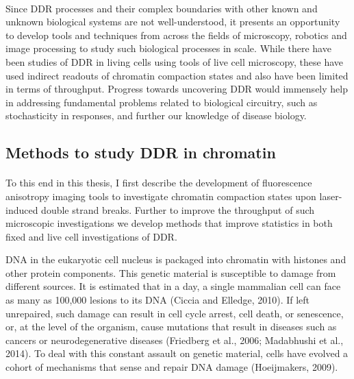 \paragraph*{} Since DDR processes and their complex boundaries with other known and unknown biological systems are not well-understood, it presents an opportunity to develop tools and techniques from across the fields of microscopy, robotics and image processing to study such biological processes in scale. While there have been studies of DDR in living cells using tools of live cell microscopy, these have used indirect readouts of chromatin compaction states and also have been limited in terms of throughput. Progress towards uncovering DDR would immensely help in addressing fundamental problems related to biological circuitry, such as stochasticity in responses, and further our knowledge of disease biology.

\subsection{Methods to study DDR in chromatin}
\paragraph*{} To this end in this thesis, I first describe the development of fluorescence anisotropy imaging tools to investigate chromatin compaction states upon laser-induced double strand breaks. Further to improve the throughput of such microscopic investigations we develop methods that improve statistics in both fixed and live cell investigations of DDR.



DNA in the eukaryotic cell nucleus is packaged into chromatin with histones and other protein components. This genetic material is susceptible to damage from different sources. It is estimated that in a day, a single mammalian cell can face as many as 100,000 lesions to its DNA (Ciccia and Elledge, 2010). If left unrepaired, such damage can result in cell cycle arrest, cell death, or senescence, or, at the level of the organism, cause mutations that result in diseases such as cancers or neurodegenerative diseases (Friedberg et al., 2006; Madabhushi et al., 2014). To deal with this constant assault on genetic material, cells have evolved a cohort of mechanisms that sense and repair DNA damage (Hoeijmakers, 2009).

